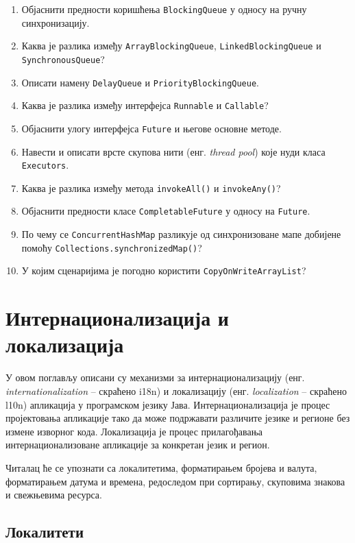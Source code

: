 \begin{enumerate}
\item Објаснити предности коришћења \texttt{BlockingQueue} у односу на ручну синхронизацију.
\item Каква је разлика између \texttt{ArrayBlockingQueue}, \texttt{LinkedBlockingQueue} и \texttt{SynchronousQueue}?
\item Описати намену \texttt{DelayQueue} и \texttt{PriorityBlockingQueue}.
\item Каква је разлика између интерфејса \texttt{Runnable} и \texttt{Callable}?
\item Објаснити улогу интерфејса \texttt{Future} и његове основне методе.
\item Навести и описати врсте скупова нити (енг. \textit{thread pool}) које нуди класа \texttt{Executors}.
\item Каква је разлика између метода \texttt{invokeAll()} и \texttt{invokeAny()}?
\item Објаснити предности класе \texttt{CompletableFuture} у односу на \texttt{Future}.
\item По чему се \texttt{ConcurrentHashMap} разликује од синхронизоване мапе добијене помоћу \texttt{Collections.synchronizedMap()}?
\item У којим сценаријима је погодно користити \texttt{CopyOnWriteArrayList}?
\end{enumerate}


\setlength{\parindent}{15pt}
\setlength{\parskip}{0pt}
\chapter{Интернационализација и локализација}

У овом поглављу описани су механизми за интернационализацију (енг. \textit{internationalization} – скраћено i18n) и локализацију (енг. \textit{localization} – скраћено l10n) апликација у програмском језику Јава. Интернационализација је процес пројектовања апликације тако да може подржавати различите језике и регионе без измене изворног кода. Локализација је процес прилагођавања интернационализоване апликације за конкретан језик и регион.

Читалац ће се упознати са локалитетима, форматирањем бројева и валута, форматирањем датума и времена, редоследом при сортирању, скуповима знакова и свежњевима ресурса.


\section{Локалитети}

